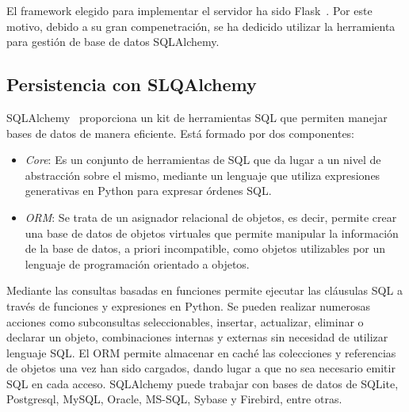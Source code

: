 El framework elegido para implementar el servidor ha sido Flask~\cite{Flask}. Por este motivo, debido a su gran compenetración, se ha dedicido utilizar la herramienta para gestión de base de datos SQLAlchemy.
\subsection{Persistencia con SLQAlchemy}
SQLAlchemy~\cite{SqlAl} proporciona un kit de herramientas SQL que permiten manejar bases de datos de manera eficiente. Está formado por dos componentes:
\begin{itemize}
\item \textit{Core}: Es un conjunto de herramientas de SQL que da lugar a un nivel de abstracción sobre el mismo, mediante un lenguaje que utiliza expresiones generativas en Python para expresar órdenes SQL.
\item \textit{ORM}: Se trata de un asignador relacional de objetos, es decir, permite crear una base de datos de objetos virtuales que permite manipular la información de la base de datos, a priori incompatible, como objetos utilizables por un lenguaje de programación orientado a objetos.
\end{itemize}
Mediante las consultas basadas en funciones permite ejecutar las cláusulas SQL a través de funciones y expresiones en Python. Se pueden realizar numerosas acciones como subconsultas seleccionables, insertar, actualizar, eliminar o declarar un objeto, combinaciones internas y externas sin necesidad de utilizar lenguaje SQL. El ORM permite almacenar en caché las colecciones y referencias de objetos una vez han sido cargados, dando lugar a que no sea necesario emitir SQL en cada acceso. SQLAlchemy puede trabajar con bases de datos de SQLite, Postgresql, MySQL, Oracle, MS-SQL, Sybase y Firebird, entre otras.
